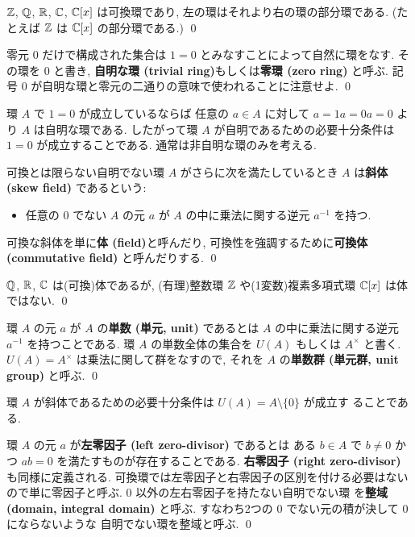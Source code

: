 \documentclass[12pt,twoside]{jarticle}
\begin{document}
\begin{example}
 ${\mathbb Z}$, ${\mathbb Q}$, ${\mathbb R}$, ${\mathbb C}$, ${\mathbb C}[x]$ は可換環であり, 
 左の環はそれより右の環の部分環である.
 (たとえば ${\mathbb Z}$ は ${\mathbb C}[x]$ の部分環である.)
 \qed
\end{example}

\begin{definition}[自明な環]
 零元 $0$ だけで構成された集合は $1=0$ とみなすことによって自然に環をなす. 
 その環を $0$ と書き, 
 {\bf 自明な環 (trivial ring)}もしくは{\bf 零環 (zero ring)} と呼ぶ. 
 記号 $0$ が自明な環と零元の二通りの意味で使われることに注意せよ. 
 \qed
\end{definition}

環 $A$ で $1=0$ が成立しているならば
任意の $a\in A$ に対して $a=1a=0a=0$ より $A$ は自明な環である.
したがって環 $A$ が自明であるための必要十分条件は $1=0$ が成立することである.
通常は非自明な環のみを考える.

\begin{definition}[斜体, 体]
 可換とは限らない自明でない環 $A$ がさらに次を満たしているとき %
 $A$ は{\bf 斜体 (skew field)} であるという:
 \begin{itemize}
  \item 任意の $0$ でない $A$ の元 $a$ が %
   $A$ の中に乗法に関する逆元 $a^{-1}$ を持つ.
 \end{itemize}
 可換な斜体を単に{\bf 体 (field)}と呼んだり, 
 可換性を強調するために{\bf 可換体 (commutative field)} と呼んだりする.
 \qed
\end{definition}

\begin{example}
 ${\mathbb Q}$, ${\mathbb R}$, ${\mathbb C}$ は(可換)体であるが, 
 (有理)整数環 ${\mathbb Z}$ や(1変数)複素多項式環 ${\mathbb C}[x]$ は体ではない.
 \qed
\end{example}

\begin{definition}[単数, 単元]
 環 $A$ の元 $a$ が $A$ の{\bf 単数 (単元, unit)} であるとは %
 $A$ の中に乗法に関する逆元 $a^{-1}$ を持つことである.
 環 $A$ の単数全体の集合を $U(A)$ もしくは $A^\times$ と書く.
 $U(A)=A^\times$ は乗法に関して群をなすので, 
 それを $A$ の{\bf 単数群 (単元群, unit group)} と呼ぶ.
 \qed
\end{definition}

環 $A$ が斜体であるための必要十分条件は $U(A)=A\setminus\{0\}$ が成立す
ることである.

\begin{definition}[零因子, 整域]
 環 $A$ の元 $a$ が{\bf 左零因子 (left zero-divisor)} であるとは
 ある $b\in A$ で $b\ne 0$ かつ $ab=0$ を満たすものが存在することである.
 {\bf 右零因子 (right zero-divisor)} も同様に定義される.
 可換環では左零因子と右零因子の区別を付ける必要はないので単に零因子と呼ぶ.
 $0$ 以外の左右零因子を持たない自明でない環
 を{\bf 整域 (domain, integral domain)} と呼ぶ.  
 すなわち2つの $0$ でない元の積が決して $0$ にならないような
 自明でない環を整域と呼ぶ.
 \qed
\end{definition}
\end{document}
